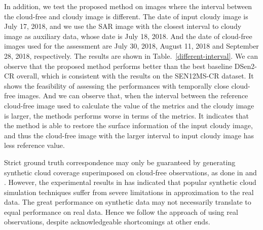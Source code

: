 \documentclass[a4paper,fleqn]{cas-dc}
\begin{document}
In addition, we test the proposed method on images where the interval between the cloud-free and cloudy image is different. The date of input cloudy image is July 17, 2018, and we use the SAR image with the closest interval to cloudy image as auxiliary data, whose date is July 18, 2018. And the date of cloud-free images used for the assessment are July 30, 2018, August 11, 2018 and September 28, 2018, respectively. The results are shown in Table.~\ref{different-interval}. We can observe that the proposed method performs better than the best baseline DSen2-CR overall, which is consistent with the results on the SEN12MS-CR dataset. It shows the feasibility of assessing the performances with temporally close cloud-free images. And we can observe that, when the interval between the reference cloud-free image used to calculate the value of the metrics and the cloudy image is larger, the methods performs worse in terms of the metrics. It indicates that the method is able to restore the surface information of the input cloudy image, and thus the cloud-free image with the larger interval to input cloudy image has less reference value.
    
\begin{table}[!h]
\small
\centering
\caption{Evaluating cloud removal performance using the cloud-free images with different intervals from cloudy images.}
\label{different-interval}
\end{table}

Strict ground truth correspondence may only be guaranteed by generating synthetic cloud coverage superimposed on cloud-free observations, as done in \cite{enomoto2017filmy} and \cite{gao2020cloud}. However, the experimental results in \cite{ebel2020cloud} has indicated that popular synthetic cloud simulation techniques suffer from severe limitations in approximation to the real data. The great performance on synthetic data may not necessarily translate to equal performance on real data. Hence we follow the approach of using real observations, despite acknowledgeable shortcomings at other ends.
\end{document}
